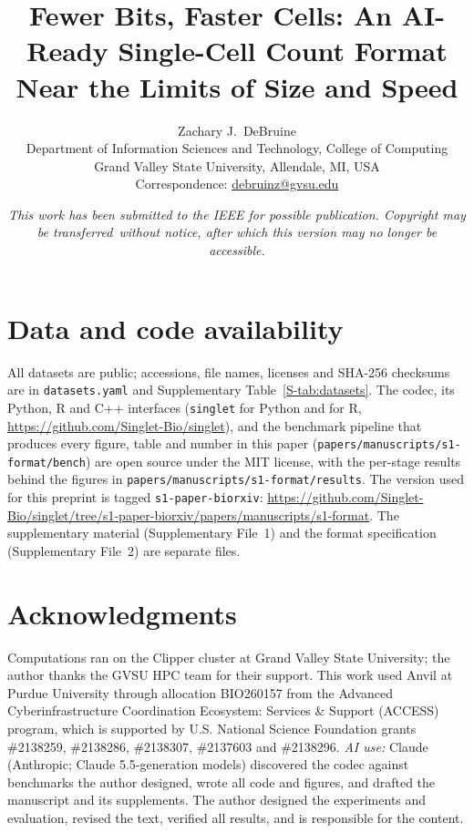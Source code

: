 \documentclass[11pt,letterpaper]{article}
\title{Fewer Bits, Faster Cells: An AI-Ready Single-Cell Count Format Near the Limits of Size and Speed}
\author{Zachary J.\ DeBruine\\[2pt]
  \small Department of Information Sciences and Technology, College of Computing\\
  \small Grand Valley State University, Allendale, MI, USA\\
  \small Correspondence: \href{mailto:debruinz@gvsu.edu}{debruinz@gvsu.edu}}
\date{\small\itshape This work has been submitted to the IEEE for possible publication. Copyright may be transferred\
without notice, after which this version may no longer be accessible.}
\begin{document}
\maketitle

\begin{abstract}

\end{abstract}








\section*{Data and code availability}
All datasets are public; accessions, file names, licenses and SHA-256 checksums are in \texttt{datasets.yaml} and
Supplementary Table~\ref{S-tab:datasets}. The \sone{} codec, its Python, R and C++ interfaces (\texttt{singlet}
\nm{rel-singlet_py} for Python and \nm{rel-singlet_r} for R, \url{https://github.com/Singlet-Bio/singlet}), and the
benchmark pipeline that produces every figure, table and number in this paper
(\texttt{papers/manuscripts/s1-format/bench}) are open source under the MIT license, with the per-stage results behind the
figures in \texttt{papers/manuscripts/s1-format/results}. The version used for this preprint is tagged
\texttt{s1-paper-biorxiv}: \url{https://github.com/Singlet-Bio/singlet/tree/s1-paper-biorxiv/papers/manuscripts/s1-format}.
The supplementary material (Supplementary File~1) and the format
specification (Supplementary File~2) are separate files.

\section*{Acknowledgments}
Computations ran on the Clipper cluster at Grand Valley State University; the author thanks the GVSU HPC team for their
support. This work used Anvil at Purdue University through allocation BIO260157 from the Advanced Cyberinfrastructure
Coordination Ecosystem: Services \& Support (ACCESS) program, which is supported by U.S. National Science Foundation
grants \#2138259, \#2138286, \#2138307, \#2137603 and \#2138296. \emph{AI use:} Claude (Anthropic; Claude 5.5-generation models) discovered the codec against benchmarks the author
designed, wrote all code and figures, and drafted the manuscript and its supplements. The author designed the experiments
and evaluation, revised the text, verified all results, and is responsible for the content.



\end{document}
